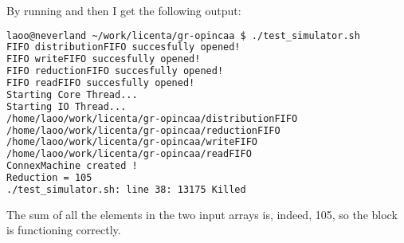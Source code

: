 By running  and then  I get the following
output:\\

\begin{lstlisting}[language=bash]
laoo@neverland ~/work/licenta/gr-opincaa $ ./test_simulator.sh 
FIFO distributionFIFO succesfully opened!
FIFO writeFIFO succesfully opened!
FIFO reductionFIFO succesfully opened!
FIFO readFIFO succesfully opened!
Starting Core Thread...
Starting IO Thread...
/home/laoo/work/licenta/gr-opincaa/distributionFIFO
/home/laoo/work/licenta/gr-opincaa/reductionFIFO
/home/laoo/work/licenta/gr-opincaa/writeFIFO
/home/laoo/work/licenta/gr-opincaa/readFIFO
ConnexMachine created !
Reduction = 105
./test_simulator.sh: line 38: 13175 Killed
\end{lstlisting}

The sum of all the elements in the two input arrays is, indeed, 105, so the
block is functioning correctly.
